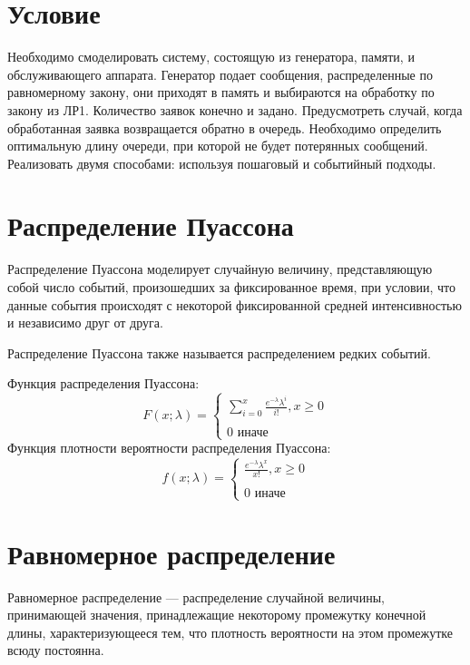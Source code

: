 \documentclass[12pt,a4paper,oneside]{report}
\begin{document}
\section*{Условие}
\quad Необходимо смоделировать систему, состоящую из генератора, памяти, и обслуживающего аппарата. Генератор подает сообщения, распределенные по равномерному закону, они приходят в память и выбираются на обработку по закону из ЛР1. Количество заявок конечно и задано. Предусмотреть случай, когда обработанная заявка возвращается обратно в очередь. Необходимо определить оптимальную длину очереди, при которой не будет потерянных сообщений. Реализовать двумя способами: используя пошаговый и событийный подходы.

\section*{Распределение Пуассона}
\quad Распределение Пуассона моделирует случайную величину, представляющую
собой число событий, произошедших за фиксированное время, при условии, что
данные события происходят с некоторой фиксированной средней интенсивностью и независимо друг от друга.

Распределение Пуассона также называется распределением редких событий.

Функция распределения Пуассона:
\begin{equation}
    F(x;\lambda) = \begin{cases}
            \sum_{i=0}^x \frac{e^{-\lambda} \lambda^i}{i!}, x \geq 0\\\\
            0 \text{ иначе }
    \end{cases}
\end{equation}
Функция плотности вероятности распределения Пуассона:
\begin{equation}
    f(x;\lambda) = \begin{cases}
            \frac{e^{-\lambda} \lambda^x}{x!}, x \geq 0\\\\
            0 \text{ иначе }
    \end{cases}
\end{equation}

\section*{Равномерное распределение}
\quad Равномерное распределение — распределение случайной величины, принимающей значения, принадлежащие некоторому промежутку конечной длины, характеризующееся тем, что плотность вероятности на этом промежутке всюду постоянна.
\end{document}
